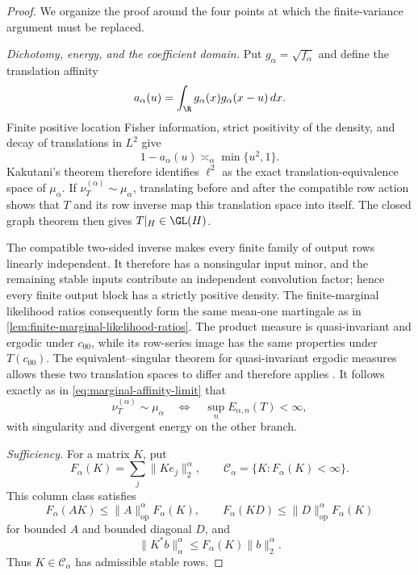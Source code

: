 \begin{proof}
We organize the proof around the four points at which the finite-variance
argument must be replaced.

\emph{Dichotomy, energy, and the coefficient domain.}
Put \(g_\alpha=\sqrt{f_\alpha}\) and define the translation affinity
\[
 a_\alpha(u)=\int_\R g_\alpha(x)g_\alpha(x-u)\,dx.
\]
Finite positive location Fisher information, strict positivity of the
density, and decay of translations in \(L^2\) give
\begin{equation}
 1-a_\alpha(u)\asymp_\alpha\min\{u^2,1\}.
 \label{eq:stable-translation-affinity}
\end{equation}
Kakutani's theorem therefore identifies \(\ell^2\) as the exact
translation-equivalence space of \(\mu_\alpha\).
If \(\nu_T^{(\alpha)}\sim\mu_\alpha\), translating before and after the
compatible row action shows that \(T\) and its row inverse map this
translation space into itself.
The closed graph theorem then gives \(T|_H\in\GL(H)\).

The compatible two-sided inverse makes every finite family of output rows
linearly independent.
It therefore has a nonsingular input minor, and the remaining stable inputs
contribute an independent convolution factor; hence every finite output
block has a strictly positive density.
The finite-marginal likelihood ratios consequently form the same mean-one
martingale as in
\cref{lem:finite-marginal-likelihood-ratios}.
The product measure is quasi-invariant and ergodic under \(c_{00}\), while
its row-series image has the same properties under \(T(c_{00})\).
The equivalent--singular theorem for quasi-invariant ergodic measures allows
these two translation spaces to differ and therefore applies
\cite{okazaki1985dichotomy}.
It follows exactly as in \eqref{eq:marginal-affinity-limit} that
\begin{equation}
 \nu_T^{(\alpha)}\sim\mu_\alpha
 \quad\Longleftrightarrow\quad
 \sup_nE_{\alpha,n}(T)<\infty,
 \label{eq:stable-energy-dichotomy}
\end{equation}
with singularity and divergent energy on the other branch.

\emph{Sufficiency.}
For a matrix \(K\), put
\[
 F_\alpha(K)=\sum_j\|Ke_j\|_2^\alpha,
 \qquad
 \mathcal C_\alpha=\{K:F_\alpha(K)<\infty\}.
\]
This column class satisfies
\begin{equation}
 F_\alpha(AK)\le\|A\|_{\mathrm{op}}^\alpha F_\alpha(K),
 \qquad
 F_\alpha(KD)\le\|D\|_{\mathrm{op}}^\alpha F_\alpha(K)
 \label{eq:stable-column-class-bounds}
\end{equation}
for bounded \(A\) and bounded diagonal \(D\), and
\begin{equation}
 \|K^*b\|_\alpha^\alpha
 \le F_\alpha(K)\|b\|_2^\alpha.
 \label{eq:stable-row-admissibility-bound}
\end{equation}
Thus \(K\in\mathcal C_\alpha\) has admissible stable rows.


\end{proof}
